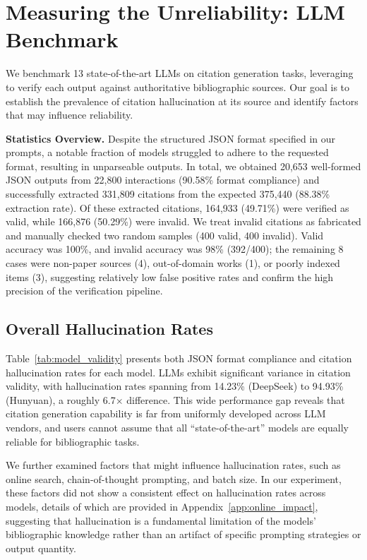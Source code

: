 \section{Measuring the Unreliability: LLM Benchmark}
\label{sec:llm_results}

We benchmark 13 state-of-the-art LLMs on citation generation tasks, leveraging \citeb to verify each output against authoritative bibliographic sources.
Our goal is to establish the prevalence of citation hallucination at its source and identify factors that may influence reliability.

% 

\noindent
\textbf{Statistics Overview.}
Despite the structured JSON format specified in our prompts, a notable fraction of models struggled to adhere to the requested format, resulting in
unparseable outputs.
In total, we obtained 20,653 well-formed JSON outputs from 22,800 interactions (90.58\% format compliance) and successfully extracted 331,809 citations from the expected 375,440 (88.38\% extraction rate).
Of these extracted citations, 164,933 (49.71\%) were verified as valid, while 166,876 (50.29\%) were invalid.
We treat invalid citations as fabricated and manually checked two random samples (400 valid, 400 invalid). Valid accuracy was 100\%, and invalid accuracy was 98\% (392/400); the remaining 8 cases were non-paper sources (4), out-of-domain works (1), or poorly indexed items (3), suggesting relatively low false positive rates and confirm the high precision of the verification pipeline.



\subsection{Overall Hallucination Rates}

Table~\ref{tab:model_validity} presents both JSON format compliance and citation hallucination rates for each model.
LLMs exhibit significant variance in citation validity, with hallucination rates spanning from 14.23\% (DeepSeek) to 94.93\% (Hunyuan), a roughly 6.7$\times$ difference.
This wide performance gap reveals that citation generation capability is far from uniformly developed across LLM vendors, and users cannot assume that all ``state-of-the-art'' models are equally reliable for bibliographic tasks.

We further examined factors that might influence hallucination rates, such as online search, chain-of-thought prompting, and batch size.
In our experiment, these factors did not show a consistent effect on hallucination rates across models, details of which are provided in Appendix~\ref{app:online_impact}, suggesting that hallucination is a fundamental limitation of the models' bibliographic knowledge rather than an artifact of specific prompting strategies or output quantity.

